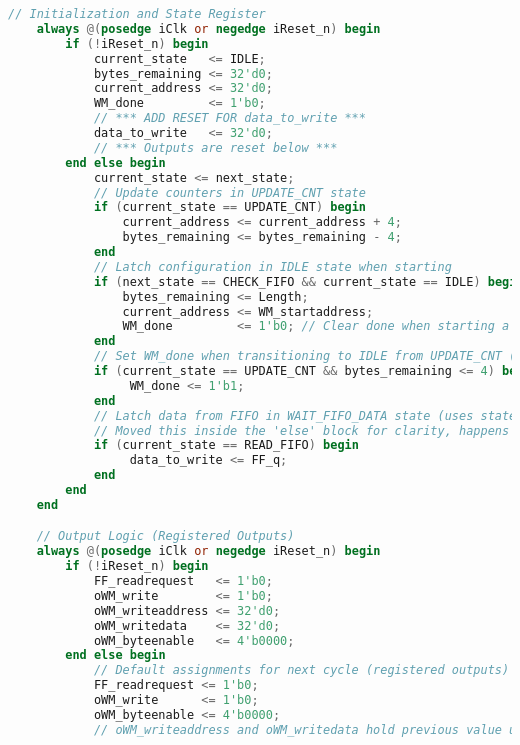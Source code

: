\begin{lstlisting}[language=Verilog, caption={WRITE\_MASTER.v - Avalon Write Master Module}, label=lst:verilog_writemaster]
    // Initialization and State Register
    always @(posedge iClk or negedge iReset_n) begin
        if (!iReset_n) begin
            current_state   <= IDLE;
            bytes_remaining <= 32'd0;
            current_address <= 32'd0;
            WM_done         <= 1'b0;
            // *** ADD RESET FOR data_to_write ***
            data_to_write   <= 32'd0;
            // *** Outputs are reset below ***
        end else begin
            current_state <= next_state;
            // Update counters in UPDATE_CNT state
            if (current_state == UPDATE_CNT) begin
                current_address <= current_address + 4;
                bytes_remaining <= bytes_remaining - 4;
            end
            // Latch configuration in IDLE state when starting
            if (next_state == CHECK_FIFO && current_state == IDLE) begin
                bytes_remaining <= Length;
                current_address <= WM_startaddress;
                WM_done         <= 1'b0; // Clear done when starting a new transfer
            end
            // Set WM_done when transitioning to IDLE from UPDATE_CNT (last word processed)
            if (current_state == UPDATE_CNT && bytes_remaining <= 4) begin
                 WM_done <= 1'b1;
            end
            // Latch data from FIFO in WAIT_FIFO_DATA state (uses state *before* edge)
            // Moved this inside the 'else' block for clarity, happens concurrently
            if (current_state == READ_FIFO) begin
                 data_to_write <= FF_q;
            end
        end
    end

    // Output Logic (Registered Outputs)
    always @(posedge iClk or negedge iReset_n) begin
        if (!iReset_n) begin
            FF_readrequest   <= 1'b0;
            oWM_write        <= 1'b0;
            oWM_writeaddress <= 32'd0;
            oWM_writedata    <= 32'd0;
            oWM_byteenable   <= 4'b0000;
        end else begin
            // Default assignments for next cycle (registered outputs)
            FF_readrequest <= 1'b0;
            oWM_write      <= 1'b0;
            oWM_byteenable <= 4'b0000;
            // oWM_writeaddress and oWM_writedata hold previous value unless changed


\end{lstlisting}
